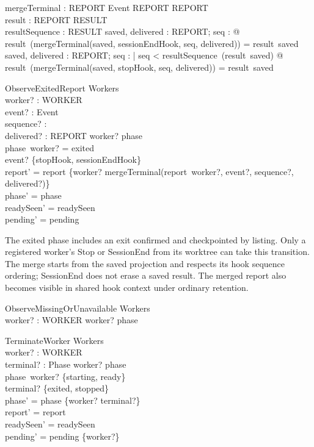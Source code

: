 \documentclass[a4paper,10pt,fleqn]{article}
\begin{document}
\begin{axdef}
  mergeTerminal : REPORT \cross Event \cross \nat \cross REPORT \fun REPORT \\
  result : REPORT \fun RESULT \\
  resultSequence : RESULT \fun \nat
\where
  \forall saved, delivered : REPORT; seq : \nat @
    result~(mergeTerminal(saved, sessionEndHook, seq, delivered)) = result~saved \\
  \forall saved, delivered : REPORT; seq : \nat |
    seq < resultSequence~(result~saved) @
    result~(mergeTerminal(saved, stopHook, seq, delivered)) = result~saved
\end{axdef}

\begin{schema}{ObserveExitedReport}
  \Delta Workers \\
  worker? : WORKER \\
  event? : Event \\
  sequence? : \nat \\
  delivered? : REPORT
\where
  worker? \in \dom phase \\
  phase~worker? = exited \\
  event? \in \{stopHook, sessionEndHook\} \\
  report' = report \oplus
    \{worker? \mapsto mergeTerminal(report~worker?, event?, sequence?, delivered?)\} \\
  phase' = phase \\
  readySeen' = readySeen \\
  pending' = pending
\end{schema}

The exited phase includes an exit confirmed and checkpointed by listing.
Only a registered worker's
Stop or SessionEnd from its worktree can take this transition. The merge
starts from the saved projection and respects its hook sequence ordering;
SessionEnd does not erase a saved result. The merged report also becomes
visible in shared hook context under ordinary retention.

\begin{schema}{ObserveMissingOrUnavailable}
  \Xi Workers \\
  worker? : WORKER
\where
  worker? \in \dom phase
\end{schema}

\begin{schema}{TerminateWorker}
  \Delta Workers \\
  worker? : WORKER \\
  terminal? : Phase
\where
  worker? \in \dom phase \\
  phase~worker? \in \{starting, ready\} \\
  terminal? \in \{exited, stopped\} \\
  phase' = phase \oplus \{worker? \mapsto terminal?\} \\
  report' = report \\
  readySeen' = readySeen \\
  pending' = pending \cup \{worker?\}
\end{schema}
\end{document}

